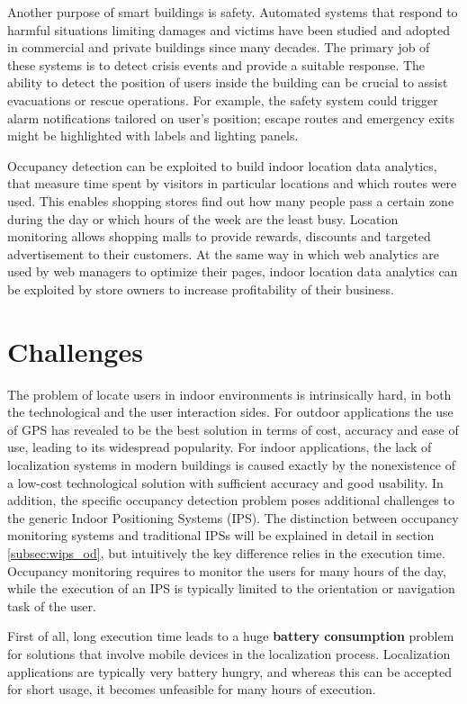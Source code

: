 \smallskip
Another purpose of smart buildings is safety. Automated systems that respond to harmful situations limiting damages and victims have been studied and adopted in commercial and private buildings since many decades. The primary job of these systems is to detect crisis events and provide a suitable response. The ability to detect the position of users inside the building can be crucial to assist evacuations or rescue operations. For example, the safety system could trigger alarm notifications tailored on user's position; escape routes and emergency exits might be highlighted with labels and lighting panels.

\smallskip
Occupancy detection can be exploited to build indoor location data analytics, that measure time spent by visitors in particular locations and which routes were used. This enables shopping stores find out how many people pass a certain zone during the day or which hours of the week are the least busy. Location monitoring allows shopping malls to provide rewards, discounts and targeted advertisement to their customers. At the same way in which web analytics are used by web managers to optimize their pages, indoor location data analytics can be exploited by store owners to increase profitability of their business.

\section{Challenges}
The problem of locate users in indoor environments is intrinsically hard, in both the technological and the user interaction sides. For outdoor applications the use of GPS has revealed to be the best solution in terms of cost, accuracy and ease of use, leading to its widespread popularity. For indoor applications, the lack of localization systems in modern buildings is caused exactly by the nonexistence of a low-cost technological solution with sufficient accuracy and good usability. In addition, the specific occupancy detection problem poses additional challenges to the generic Indoor Positioning Systems (IPS). The distinction between occupancy monitoring systems and traditional IPSs will be explained in detail in section \ref{subsec:wips_od}, but intuitively the key difference relies in the execution time. Occupancy monitoring requires to monitor the users for many hours of the day, while the execution of an IPS is typically limited to the orientation or navigation task of the user. 

\smallskip
First of all, long execution time leads to a huge \textbf{battery consumption} problem for solutions that involve mobile devices in the localization process. Localization applications are typically very battery hungry, and whereas this can be accepted for short usage, it becomes unfeasible for many hours of execution.


